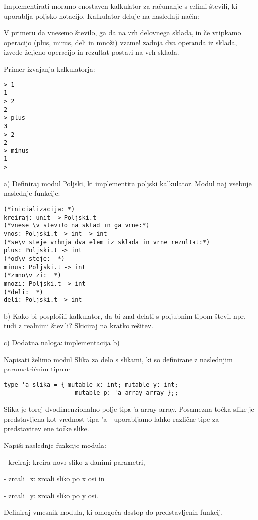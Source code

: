 \begin{ex}
Implementirati moramo enostaven kalkulator za ra\v cunanje s celimi
\v stevili, ki uporablja poljsko notacijo. Kalkulator deluje na naslednji
na\v cin:

V primeru da vnesemo \v stevilo, ga da na vrh delovnega sklada, in \v ce
vtipkamo operacijo (plus, minus, deli in mno\v zi) vzame! zadnja dva
operanda iz sklada, izvede \v zeljeno operacijo in rezultat postavi na
vrh sklada.

Primer izvajanja kalkulatorja: 
\begin{lstlisting}
> 1 
1 
> 2 
2 
> plus 
3 
> 2 
2 
> minus 
1 
> 
\end{lstlisting}

a) Definiraj modul Poljski, ki implementira poljski kalkulator. Modul
naj vsebuje naslednje funkcije:

\begin{lstlisting}
(*inicializacija: *)
kreiraj: unit -> Poljski.t      
(*vnese \v stevilo na sklad in ga vrne:*)
vnos: Poljski.t -> int -> int   
(*se\v steje vrhnja dva elem iz sklada in vrne rezultat:*)
plus: Poljski.t -> int    
(*od\v steje:  *)
minus: Poljski.t -> int         
(*zmno\v zi:  *)
mnozi: Poljski.t -> int         
(*deli:  *)
deli: Poljski.t -> int          
\end{lstlisting}

b) Kako bi posplo\v sili kalkulator, da bi znal delati s poljubnim tipom \v stevil npr. tudi z realnimi \v stevili? Skiciraj na kratko re\v sitev. 

c) Dodatna naloga: implementacija b)  

\end{ex}
\begin{ex}
Napisati \v zelimo modul Slika za delo s slikami, ki so definirane z naslednjim parametri\v cnim tipom:

\begin{lstlisting}
type 'a slika = { mutable x: int; mutable y: int;
					mutable p: 'a array array };; 
\end{lstlisting}

Slika je torej dvodimenzionalno polje tipa 'a array array. Posamezna to\v cka slike je predstavljena kot vrednost tipa 'a---uporabljamo lahko razli\v cne tipe za predstavitev ene to\v cke slike.

Napi\v si naslednje funkcije modula:

- kreiraj: kreira novo sliko z danimi parametri,

- zrcali\_x: zrcali sliko po x osi in

- zrcali\_y: zrcali sliko po y osi.

Definiraj vmesnik modula, ki omogo\v ca dostop do predstavljenih funkcij.

\end{ex}
